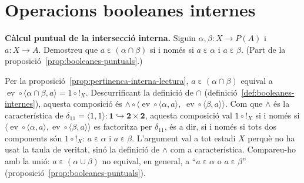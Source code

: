 \section{Operacions booleanes internes}\label{prac:booleanes-internes}

\begin{exercici}
\textbf{Càlcul puntual de la intersecció interna.} Siguin \(\alpha,\beta\colon X\to P(A)\) i \(a\colon X\to A\). Demostreu que \(a\mathrel{\varepsilon}(\alpha\cap\beta)\) si i només si \(a\mathrel{\varepsilon}\alpha\) i \(a\mathrel{\varepsilon}\beta\). (Part de la proposició~\ref{prop:booleanes-puntuals}.)
\end{exercici}
\begin{solucio}
Per la proposició~\ref{prop:pertinenca-interna-lectura}, \(a\mathrel{\varepsilon}(\alpha\cap\beta)\) equival a \(\operatorname{ev}\circ\langle\alpha\cap\beta,a\rangle=1\circ{!}_X\). Descurrificant la definició de \(\cap\) (definició~\ref{def:booleanes-internes}), aquesta composició és \(\wedge\circ\langle\operatorname{ev}\circ\langle\alpha,a\rangle,\;\operatorname{ev}\circ\langle\beta,a\rangle\rangle\). Com que \(\wedge\) és la característica de \(\delta_{11}=\langle1,1\rangle\colon\mathbf1\hookrightarrow\mathbf2\times\mathbf2\), aquesta composició val \(1\circ{!}_X\) si i només si \(\langle\operatorname{ev}\circ\langle\alpha,a\rangle,\operatorname{ev}\circ\langle\beta,a\rangle\rangle\) es factoritza per \(\delta_{11}\), és a dir, si i només si tots dos components són \(1\circ{!}_X\): \(a\mathrel{\varepsilon}\alpha\) i \(a\mathrel{\varepsilon}\beta\). L'argument val a tot estadi \(X\) perquè no ha usat la taula de veritat, sinó la definició de \(\wedge\) com a característica. Compareu-ho amb la unió: \(a\mathrel{\varepsilon}(\alpha\cup\beta)\) no equival, en general, a \enquote{\(a\mathrel{\varepsilon}\alpha\) o \(a\mathrel{\varepsilon}\beta\)} (proposició~\ref{prop:booleanes-puntuals}).
\end{solucio}

